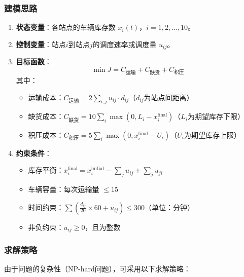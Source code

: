 \documentclass[12pt,a4paper]{ctexart}
\begin{document}
\subsubsection{建模思路}

\begin{enumerate}
    \item \textbf{状态变量}：各站点的车辆库存数 $x_i(t)$，$i=1,2,\ldots,10$。

    \item \textbf{控制变量}：站点$i$到站点$j$的调度速率或调度量 $u_{ij}$。

    \item \textbf{目标函数}：
    \begin{equation}
        \min J = C_{\text{运输}} + C_{\text{缺货}} + C_{\text{积压}}
    \end{equation}
    其中：
    \begin{itemize}
        \item 运输成本：$C_{\text{运输}} = 2 \sum_{i,j} u_{ij} \cdot d_{ij}$（$d_{ij}$为站点间距离）
        \item 缺货成本：$C_{\text{缺货}} = 10 \sum_{i} \max(0, L_i - x_i^{\text{final}})$（$L_i$为期望库存下限）
        \item 积压成本：$C_{\text{积压}} = 5 \sum_{i} \max(0, x_i^{\text{final}} - U_i)$（$U_i$为期望库存上限）
    \end{itemize}

    \item \textbf{约束条件}：
    \begin{itemize}
        \item 库存平衡：$x_i^{\text{final}} = x_i^{\text{initial}} - \sum_j u_{ij} + \sum_j u_{ji}$
        \item 车辆容量：每次运输量 $\leq 15$
        \item 时间约束：$\sum \left(\frac{d_{ij}}{20} \times 60 + u_{ij}\right) \leq 300$（单位：分钟）
        \item 非负约束：$u_{ij} \geq 0$，且为整数
    \end{itemize}
\end{enumerate}

\subsubsection{求解策略}

由于问题的复杂性（NP-hard问题），可采用以下求解策略：
\end{document}
